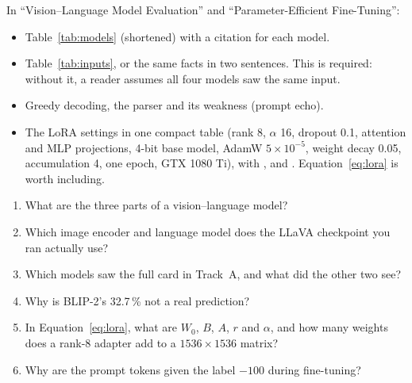 \begin{foryourreport}
In ``Vision--Language Model Evaluation'' and ``Parameter-Efficient Fine-Tuning'':
\begin{itemize}
  \item Table~\ref{tab:models} (shortened) with a citation for each model.
  \item Table~\ref{tab:inputs}, or the same facts in two sentences. This is required: without it, a reader assumes all four models saw the same input.
  \item Greedy decoding, the parser and its weakness (prompt echo).
  \item The LoRA settings in one compact table (rank 8, $\alpha$ 16, dropout 0.1, attention and MLP projections, 4-bit base model, AdamW $5\times10^{-5}$, weight decay 0.05, accumulation 4, one epoch, GTX 1080 Ti), with \citet{hu2022lora}, \citet{dettmers2023qlora} and \citet{loshchilov2019}. Equation~\ref{eq:lora} is worth including.
\end{itemize}
\end{foryourreport}

\begin{selfcheck}
\begin{enumerate}
  \item What are the three parts of a vision--language model?
  \item Which image encoder and language model does the LLaVA checkpoint you ran actually use?
  \item Which models saw the full card in Track~A, and what did the other two see?
  \item Why is BLIP-2's 32.7\,\% not a real prediction?
  \item In Equation~\ref{eq:lora}, what are $W_0$, $B$, $A$, $r$ and $\alpha$, and how many weights does a rank-8 adapter add to a $1536\times1536$ matrix?
  \item Why are the prompt tokens given the label $-100$ during fine-tuning?
\end{enumerate}
\end{selfcheck}
